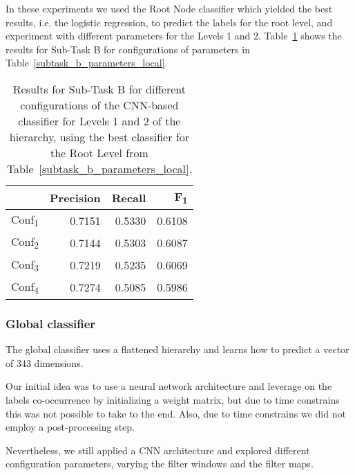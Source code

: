 \documentclass[11pt,a4paper]{article}
\begin{document}
In these experiments we used the Root Node classifier which yielded the best
results, i.e. the logistic regression, to predict the labels for the root level,
and experiment with different parameters for the Levels 1 and 2.
Table~\ref{level-1-2} shows the results for Sub-Task B for configurations of
parameters in Table~\ref{subtask_b_parameters_local}.

\begin{table}[!h]
\begin{center}
\begin{tabular}{|l|r|r|r|}
\hline\centering\textbf{}  & \textbf{Precision} &  \textbf{Recall} &  \textbf{F\textsubscript{1}}\\
\hline
Conf\textsubscript{1} & 0.7151 & 0.5330 & 0.6108 \\
Conf\textsubscript{2} & 0.7144 & 0.5303 & 0.6087 \\
Conf\textsubscript{3} & 0.7219 & 0.5235 & 0.6069 \\
Conf\textsubscript{4} & 0.7274 & 0.5085 & 0.5986 \\
\hline
\end{tabular}
\end{center}
\caption{\label{level-1-2} Results for Sub-Task B for different configurations
of the CNN-based classifier for Levels 1 and 2 of the hierarchy, using the best
classifier for the Root Level from Table~\ref{subtask_b_parameters_local}.}
\end{table}






\subsubsection{Global classifier}

The global classifier uses a flattened hierarchy and learns how to predict a
vector of 343 dimensions.

Our initial idea was to use a neural network architecture and leverage on the
labels co-occurrence by initializing a weight matrix, but due to time constrains
this was not possible to take to the end. Also, due to time constrains we did not
employ a post-processing step.

Nevertheless, we still applied a CNN architecture and explored different configuration
parameters, varying the filter windows and the filter maps.

\begin{comment}
dropout_p = 0.5
fully_connected_layers=2
filtered = np.array(len(labels2idx) * [0.4])
\end{comment}
\end{document}
